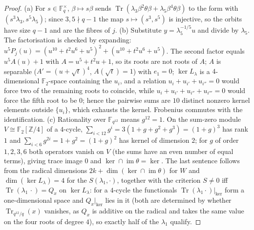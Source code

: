 \documentclass[11pt,a4paper]{amsart}
\theoremstyle{definition}
\newcommand{\F}{\mathbb{F}}
\newcommand{\Z}{\mathbb{Z}}
\newcommand{\Tr}{\operatorname{Tr}}
\newcommand{\im}{\operatorname{im}}
\begin{document}
\begin{proof}
(a) For $s\in\F_q^\times$, $\beta\mapsto s\beta$ sends $\Tr(\lambda_3\beta^2\theta\beta+\lambda_5\beta^4\theta\beta)$ to the form with $(s^3\lambda_3,s^5\lambda_5)$; since $3,5\nmid q-1$ the map $s\mapsto(s^3,s^5)$ is injective, so the orbits have size $q-1$ and are the fibres of $j$. (b) Substitute $y=\lambda_5^{-1/5}u$ and divide by $\lambda_5$. The factorisation is checked by expanding: $u^5P_j(u)=(u^{10}+t^2u^6+u^5)^2+(u^{10}+t^2u^6+u^5)$. The second factor equals $u^5A(u)+1$ with $A=u^5+t^2u+1$, so its roots are not roots of $A$; $A$ is separable ($A'=(u+\sqrt t)^4$, $A(\sqrt t)=1$) with $e_1=0$; $\ker L_\lambda$ is a $4$-dimensional $\F_2$-space containing the $u_i$, and a relation $u_i+u_{i'}+u_{i''}=0$ would force two of the remaining roots to coincide, while $u_i+u_{i'}+u_{i''}+u_{i'''}=0$ would force the fifth root to be $0$; hence the pairwise sums are $10$ distinct nonzero kernel elements outside $\{u_i\}$, which exhausts the kernel. Frobenius commutes with the identification. (c) Rationality over $\F_{q^{12}}$ means $g^{12}=1$. On the sum-zero module $V\cong\F_2[\Z/4]$ of a $4$-cycle, $\sum_{i<12}g^i=3(1+g+g^2+g^3)=(1+g)^3$ has rank $1$ and $\sum_{i<6}g^{2i}=1+g^2=(1+g)^2$ has kernel of dimension $2$; for $g$ of order $1,2,3,6$ both operators vanish on $V$ (the sums have an even number of equal terms), giving trace image $0$ and $\ker\cap\im\theta=\ker$. The last sentence follows from the radical dimensions $2k+\dim(\ker\cap\im\theta)$ for $W$ and $\dim(\ker L_\lambda)=4$ for the $S(\lambda_1,\cdot)$, together with the criterion $S\ne0$ iff $\Tr(\lambda_1\,\cdot)=Q_x$ on $\ker L_\lambda$: for a $4$-cycle the functionals $\Tr(\lambda_1\cdot)|_{\ker}$ form a one-dimensional space and $Q_x|_{\ker}$ lies in it (both are determined by whether $\Tr_{q^{12}/q}(x)$ vanishes, as $Q_x$ is additive on the radical and takes the same value on the four roots of degree $4$), so exactly half of the $\lambda_1$ qualify.
\end{proof}
\end{document}
